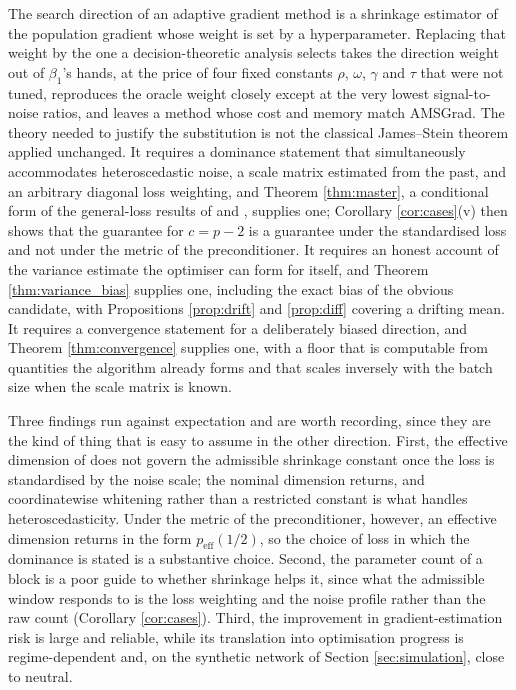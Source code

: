 \documentclass[a4paper,fleqn]{cas-sc}
\theoremstyle{plain}
\theoremstyle{definition}
\theoremstyle{remark}
\newcommand{\rev}[1]{#1}
\newcommand{\peffq}[1]{p_{\mathrm{eff}}(#1)}
\begin{document}
The search direction of an adaptive gradient method is a shrinkage estimator of the population gradient whose weight is set by a hyperparameter. Replacing that weight by the one a decision-theoretic analysis selects \rev{takes the direction weight out of $\beta_1$'s hands, at the price of four fixed constants $\rho$, $\omega$, $\gamma$ and $\tau$ that were not tuned}, reproduces the oracle weight closely except at the very lowest signal-to-noise ratios, and leaves a method whose cost and memory match AMSGrad. The theory needed to justify the substitution is not the classical James--Stein theorem applied unchanged. It requires a dominance statement that simultaneously accommodates heteroscedastic noise, a scale matrix estimated from the past, and \rev{an arbitrary diagonal loss weighting, and Theorem \ref{thm:master}, a conditional form of the general-loss results of \citet{bock1975} and \citet{berger1976jmva}, supplies one; Corollary \ref{cor:cases}(v) then shows that the guarantee for $c=p-2$ is a guarantee under the standardised loss and not under the metric of the preconditioner.} It requires an honest account of the variance estimate the optimiser can form for itself, and Theorem \ref{thm:variance_bias} supplies one, including the exact bias of the obvious candidate\rev{, with Propositions \ref{prop:drift} and \ref{prop:diff} covering a drifting mean}. It requires a convergence statement for a deliberately biased direction, and Theorem \ref{thm:convergence} supplies one, with a floor that is computable from quantities the algorithm already forms and that scales inversely with the batch size\rev{ when the scale matrix is known}.

Three findings run against expectation and are worth recording, since they are the kind of thing that is easy to assume in the other direction. First, the effective dimension of \citet{bock1975} does not govern the admissible shrinkage constant once the loss is standardised by the noise scale; the nominal dimension returns, and coordinatewise whitening rather than a restricted constant is what handles heteroscedasticity\rev{. Under the metric of the preconditioner, however, an effective dimension returns in the form $\peffq{1/2}$, so the choice of loss in which the dominance is stated is a substantive choice}. Second, the parameter count of a block is a poor guide to whether shrinkage helps it, since what the admissible window responds to is the loss weighting and the noise profile rather than the raw count (Corollary \ref{cor:cases}). Third, the improvement in gradient-estimation risk is large and reliable, while its translation into optimisation progress is regime-dependent and, on the synthetic network of Section \ref{sec:simulation}, close to neutral.
\end{document}
